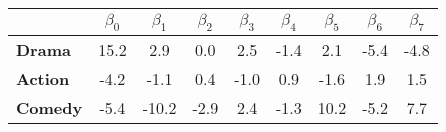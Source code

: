 \begin{tabular}{|l|c|c|c|c|c|c|c|c|}
\hline
&\textbf{$\beta_{0}$}&\textbf{$\beta_{1}$}&\textbf{$\beta_{2}$}&\textbf{$\beta_{3}$}&\textbf{$\beta_{4}$}&\textbf{$\beta_{5}$}&\textbf{$\beta_{6}$}&\textbf{$\beta_{7}$}\\\hline
\textbf{Drama}&15.2&2.9&0.0&2.5&-1.4&2.1&-5.4&-4.8\\\hline
\textbf{Action}&-4.2&-1.1&0.4&-1.0&0.9&-1.6&1.9&1.5\\\hline
\textbf{Comedy}&-5.4&-10.2&-2.9&2.4&-1.3&10.2&-5.2&7.7\\\hline
\end{tabular}
